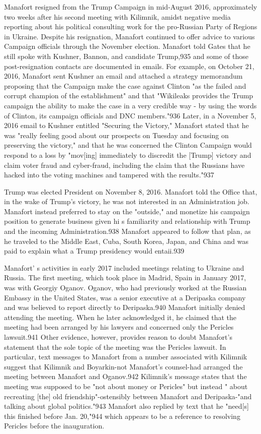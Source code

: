 Manafort resigned from the Trump Campaign in mid-August 2016, approximately two weeks after his second meeting with Kilimnik, amidst negative media reporting about his political consulting work for the pro-Russian Party of Regions in Ukraine. Despite his resignation, Manafort continued to offer advice to various Campaign officials through the November election. Manafort told Gates that he still spoke with Kushner, Bannon, and candidate Trump,935 and some of those post-resignation contacts are documented in emails. For example, on October 21, 2016, Manafort sent Kushner an email and attached a  strategy memorandum proposing that the Campaign make the case against Clinton "as the failed and corrupt champion of the establishment" and that "Wikileaks provides the Trump campaign the ability to make the case in a very credible way -  by using the words of Clinton,  its campaign officials and DNC members."936 Later, in a November 5, 2016 email to Kushner entitled "Securing the Victory," Manafort stated that he was "really feeling good about our prospects on Tuesday and focusing on preserving the victory," and that he was concerned the Clinton Campaign would respond to a  loss by "mov[ing] immediately to discredit the [Trump] victory and claim voter fraud and cyber-fraud, including the claim that the Russians have hacked into the voting machines and tampered with the results."937

Trump was elected President on November 8, 2016. Manafort told the Office that, in the wake of Trump's victory, he was not interested in an Administration job. Manafort instead preferred to stay on the "outside," and monetize his campaign position to generate business given hi s  familiarity and relationship with Trump and the incoming Administration.938 Manafort appeared to follow that plan, as he traveled to the Middle East, Cuba, South Korea, Japan, and China and was paid to explain what a Trump presidency would entaii.939

Manafort' s activities in early 2017 included meetings relating to Ukraine and Russia. The first meeting, which took place in Madrid, Spain in January 2017, was with Georgiy Oganov. Oganov, who had previously worked at the Russian Embassy in the United States, was a  senior executive at a Deripaska company and was believed to report directly to Deripaska.940 Manafort initially denied attending the meeting. When he later acknowledged it, he claimed that the meeting had been arranged by his lawyers and concerned only the Pericles lawsuit.941 Other evidence, however, provides reason to doubt Manafort's statement that the sole topic of the meeting was the Pericles lawsuit. In particular, text messages to Manafort from a number associated with Kilimnik suggest that Kilimnik and Boyarkin-not Manafort's counsel-had arranged the meeting between Manafort and Oganov.942 Kilimnik's message states that the meeting was supposed to be "not about money or Pericles" but instead " about recreating [the] old friendship"-ostensibly between Manafort and Deripaska-"and talking about global politics."943 Manafort also replied by text that he "need[s] this finished before Jan. 20,"944 which appears to be a reference to resolving Pericles before the inauguration.

